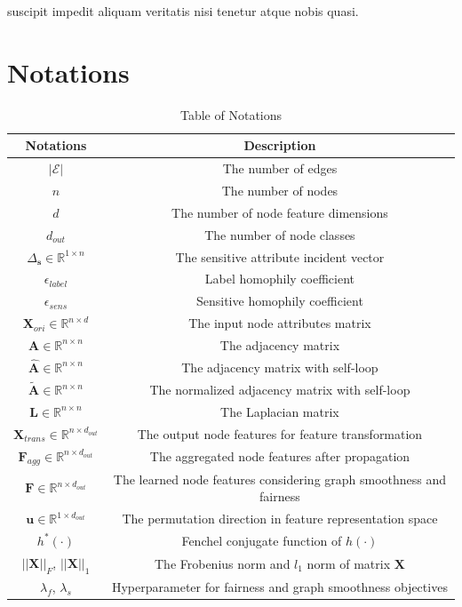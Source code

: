 \documentclass[letterpaper]{article} %
\theoremstyle{plain}
\theoremstyle{definition}
\theoremstyle{remark}
\begin{document}
suscipit impedit aliquam veritatis nisi tenetur atque nobis quasi.\clearpage



\clearpage

\appendix
\onecolumn
\section{Notations}
\begin{table}[h]
\caption{Table of Notations}
\centering
    \begin{tabular}{ cc}
    \toprule
    Notations & Description \\
    \hline
    $|\mathcal{E}|$ & The number of edges \\
    $n$ & The number of nodes\\
    $d$ & The number of node feature dimensions\\
    $d_{out}$ & The number of node classes\\
    $\Delta_{\mathbf{s}}\in\mathbb{R}^{1\times n}$ & The sensitive attribute incident vector \\
    $\epsilon_{label}$ & Label homophily coefficient \\
    $\epsilon_{sens}$ & Sensitive homophily coefficient \\
    $\mathbf{X}_{ori}\in\mathbb{R}^{n\times d}$ & The input node attributes matrix \\
    $\mathbf{A}\in\mathbb{R}^{n\times n}$ & The adjacency matrix\\
    $\hat{\mathbf{A}}\in\mathbb{R}^{n\times n}$ & The adjacency matrix with self-loop\\
    $\tilde{\mathbf{A}}\in\mathbb{R}^{n\times n}$ & The normalized adjacency matrix with self-loop\\
    $\mathbf{L}\in\mathbb{R}^{n\times n}$ & The Laplacian matrix\\
    $\mathbf{X}_{trans}\in\mathbb{R}^{n\times d_{out}}$ & The output node features for feature transformation \\
    $\mathbf{F}_{agg}\in\mathbb{R}^{n\times d_{out}}$ & The aggregated node features after propagation \\
    $\mathbf{F}\in\mathbb{R}^{n\times d_{out}}$ & The learned node features considering graph smoothness and fairness \\
    $\mathbf{u}\in\mathbb{R}^{1\times d_{out}}$ & The permutation direction in feature representation space \\
    $h^{*}(\cdot)$ & Fenchel conjugate function of $h(\cdot)$ \\
    $||\mathbf{X}||_F$, $||\mathbf{X}||_1$ & The Frobenius norm and $l_1$ norm of matrix $\mathbf{X}$\\
    $\lambda_f$, $\lambda_s$ & Hyperparameter for fairness and graph smoothness objectives \\
    \bottomrule
    \end{tabular}

\end{table}
\end{document}
